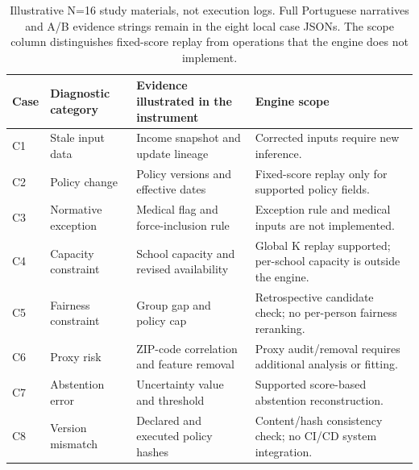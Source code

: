 \begin{table}[t]
\centering\small
\caption{Illustrative N=16 study materials, not execution logs. Full Portuguese narratives and A/B evidence strings remain in the eight local case JSONs. The scope column distinguishes fixed-score replay from operations that the engine does not implement.}
\label{tab:appeal_scenarios}
\begin{tabularx}{\textwidth}{lp{}Xp{}}
\toprule
Case & Diagnostic category & Evidence illustrated in the instrument & Engine scope \\
\midrule
C1 & Stale input data & Income snapshot and update lineage & Corrected inputs require new inference. \\
C2 & Policy change & Policy versions and effective dates & Fixed-score replay only for supported policy fields. \\
C3 & Normative exception & Medical flag and force-inclusion rule & Exception rule and medical inputs are not implemented. \\
C4 & Capacity constraint & School capacity and revised availability & Global K replay supported; per-school capacity is outside the engine. \\
C5 & Fairness constraint & Group gap and policy cap & Retrospective candidate check; no per-person fairness reranking. \\
C6 & Proxy risk & ZIP-code correlation and feature removal & Proxy audit/removal requires additional analysis or fitting. \\
C7 & Abstention error & Uncertainty value and threshold & Supported score-based abstention reconstruction. \\
C8 & Version mismatch & Declared and executed policy hashes & Content/hash consistency check; no CI/CD system integration. \\
\bottomrule
\end{tabularx}
\end{table}
